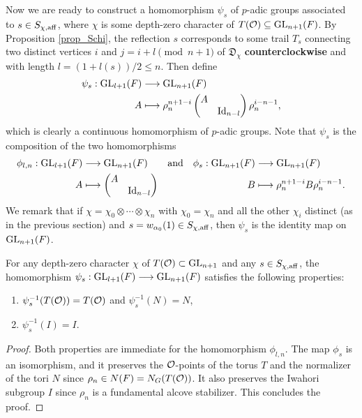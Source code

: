     Now we are ready to construct a homomorphism $\psi_s$ of $p$-adic groups associated to $s\in S_{\chi,\mathrm{aff}}$, where $\chi$ is some depth-zero character of $T(\mathcal{O})\subseteq\mathrm{GL}_{n+1}(F)$. By Proposition \ref{prop_Schi}, the reflection $s$ corresponds to some trail $T_s$ connecting two distinct vertices $i$ and $j=i+l\pmod{n+1}$ of $\mathfrak{D}_\chi$ \textbf{counterclockwise} and with length $l=(1+l(s))/2\leq n$. Then define
    \begin{align}\label{eqn_psis}
        \psi_s:\mathrm{GL}_{l+1}(F)&\longrightarrow\mathrm{GL}_{n+1}(F)\\
        A&\longmapsto\rho_n^{n+1-i}
        \begin{pmatrix}
            A&\\
            & \mathrm{Id}_{n-l}
        \end{pmatrix}\rho_n^{i-n-1},
    \end{align}
    which is clearly a continuous homomorphism of $p$-adic groups. Note that $\psi_s$ is the composition of the two homomorphisms
    \begin{align*}
        \phi_{l,n}:\mathrm{GL}_{l+1}(F)&\longrightarrow\mathrm{GL}_{n+1}(F)&\text{and}\quad\phi_s:\mathrm{GL}_{n+1}(F)&\longrightarrow\mathrm{GL}_{n+1}(F)\\
        A&\longmapsto
        \begin{pmatrix}
            A&\\
            &\mathrm{Id}_{n-l}
        \end{pmatrix}
        &B&\longmapsto\rho_n^{n+1-i}
        B\rho_n^{i-n-1}.
    \end{align*}
    We remark that if $\chi=\chi_0\otimes\cdots\otimes\chi_n$ with $\chi_0=\chi_n$ and all the other $\chi_i$ distinct (as in the previous section) and $s=w_{\alpha_0}(1)\in S_{\chi,\mathrm{aff}}$, then $\psi_s$ is the identity map on $\mathrm{GL}_{n+1}(F)$.

    \begin{lemma}
        For any depth-zero character $\chi$ of $T(\mathcal{O})\subset\mathrm{GL}_{n+1}$ and any $s\in S_{\chi,\mathrm{aff}}$, the homomorphism $\psi_s:\mathrm{GL}_{l+1}(F)\longrightarrow\mathrm{GL}_{n+1}(F)$ satisfies the following properties:
        \begin{enumerate}
            \item $\psi_s^{-1}(T(\mathcal{O}))=T(\mathcal{O})$ and $\psi_s^{-1}(N)=N$,
            \item $\psi_s^{-1}(I)=I$.
        \end{enumerate}
    \end{lemma}

    \begin{proof}
        Both properties are immediate for the homomorphism $\phi_{l,n}$. The map $\phi_s$ is an isomorphism, and it preserves the $\mathcal{O}$-points of the torus $T$ and the normalizer of the tori $N$ since $\rho_n\in N(F)=N_G(T(\mathcal{O}))$. It also preserves the Iwahori subgroup $I$ since $\rho_n$ is a fundamental alcove stabilizer. This concludes the proof.
    \end{proof}

